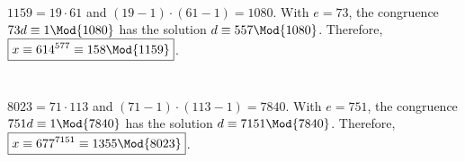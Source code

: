 \documentclass[
  coursecode={MTHE 418},
  assignmentname={Homework \homeworknumber},
  studentnumber=20053722,
  name={Bryan Hoang},
  draft,
]{
  ltxanswer%
}
\date{2022-02-28}
\begin{document}
  \begin{questions}
    \setcounter{question}{\questionnumber}
    \addtocounter{question}{-1}
    \question[10]\
    \begin{parts}
      \addtocounter{partno}{2}
      \part{}
      \begin{solution}
        \(1159 = 19 \cdot 61\) and \((19 - 1)\cdot (61 - 1) = 1080\). With \(e = 73\), the congruence \(73d \equiv 1 \Mod{1080}\) has the solution \(d \equiv 557 \Mod{1080}\). Therefore, \(\boxed{x \equiv 614^{577} \equiv 158 \Mod{1159}}\).
      \end{solution}

      \part{}
      \begin{solution}
        \(8023 = 71 \cdot 113\) and \((71 - 1) \cdot (113 - 1) = 7840\). With \(e = 751\), the congruence \(751d \equiv 1 \Mod{7840}\) has the solution \(d \equiv 7151 \Mod{7840}\). Therefore, \(\boxed{x \equiv 677^{7151} \equiv 1355 \Mod{8023}}\).
      \end{solution}
    \end{parts}
  \end{questions}
\end{document}
